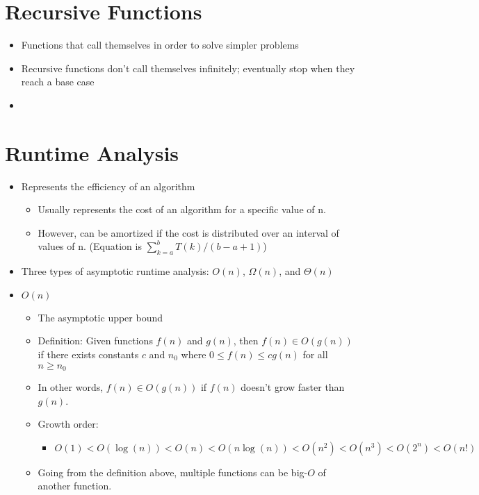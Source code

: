 \documentclass{article}
\begin{document}
\section{Recursive Functions}
\begin{itemize}
    \item Functions that call themselves in order to solve simpler problems
    \item Recursive functions don't call themselves infinitely; eventually stop when they reach a base case
    \item 
\end{itemize}

\section{Runtime Analysis}
\begin{itemize}
    \item Represents the efficiency of an algorithm
        \begin{itemize}
            \item Usually represents the cost of an algorithm for a specific value of n. 
            \item However, can be amortized if the cost is distributed over an interval of values of n. (Equation is $\sum_{k=a}^{b} T(k) / (b-a+1)$)
        \end{itemize}
    \item Three types of asymptotic runtime analysis: $O(n)$, $\Omega(n)$, and $\Theta(n)$
    \item $O(n)$
        \begin{itemize}
            \item The asymptotic upper bound
            \item Definition: Given functions $f(n)$ and $g(n)$, then $f(n) \in O(g(n))$ if there exists constants $c$ and $n_0$ where $0 \leq f(n) \leq cg(n)$ for all $n \geq n_0$
            \item In other words, $f(n) \in O(g(n))$ if $f(n)$ doesn't grow faster than $g(n)$.
            \item Growth order:
                \begin{itemize}
                    \item $O(1) < O(\log(n)) < O(n) < O(n \log(n)) < O(n^2) < O(n^3) < O(2^n) < O(n!)$
                \end{itemize}
            \item Going from the definition above, multiple functions can be big-$O$ of another function.

\end{itemize}
\end{itemize}
\end{document}
